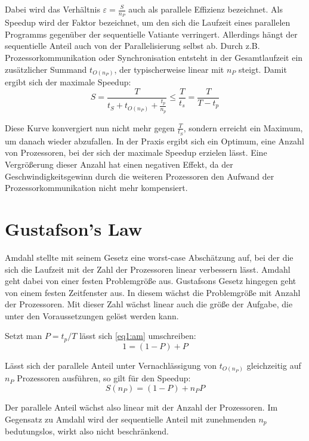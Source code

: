		Dabei wird das Verhältnis $\varepsilon = \frac{S}{n_P}$ auch als \gls{parallele Effizienz} bezeichnet. Als \Gls{Speedup} wird der Faktor bezeichnet, um den sich die Laufzeit eines parallelen Programms gegenüber der sequentielle Vatiante verringert.
		Allerdings hängt der sequentielle Anteil auch von der Parallelisierung selbst ab. Durch z.B. Prozessorkommunikation oder Synchronisation entsteht in der Gesamtlaufzeit ein zusätzlicher Summand	$t_{O(n_P)}$, der typischerweise linear mit $n_P$ steigt. Damit ergibt sich der maximale \Gls{Speedup}:		
		\begin{equation}
		    S = \frac{T}{t_S + t_{O(n_P)} + \frac{t_p}{n_p}} \leq \frac{T}{t_s} = \frac{T}{T-t_p}		
		\end{equation}
		
		Diese Kurve konvergiert nun nicht mehr gegen $\frac{T}{t_S}$, sondern erreicht ein Maximum, um danach wieder abzufallen. In der Praxis ergibt sich ein Optimum, eine Anzahl von Prozessoren, bei der sich der maximale \Gls{Speedup} erzielen lässt. Eine Vergrößerung dieser Anzahl hat einen negativen Effekt, da der Geschwindigkeitsgewinn durch die weiteren Prozessoren den Aufwand der Prozessorkommunikation nicht mehr kompensiert.


		\section{Gustafson's Law}
		Amdahl stellte mit seinem Gesetz eine worst-case Abschätzung auf, bei der die sich die Laufzeit mit der Zahl der Prozessoren linear verbessern lässt. Amdahl geht dabei von einer festen Problemgröße aus. Gustafsons Gesetz hingegen geht von einem festen Zeitfenster aus. In diesem wächst die Problemgröße mit Anzahl der Prozessoren. Mit dieser Zahl wächst linear auch die größe der Aufgabe, die unter den Voraussetzungen gelöst werden kann.

		Setzt man $P=t_p/T$ lässt sich \ref{eq1:am} umschreiben:
		\begin{equation}
			1 = (1 - P) + P
		\end{equation}

    	Lässt sich der parallele Anteil unter Vernachlässigung von $t_{O(n_P)}$ gleichzeitig auf $n_P$ Prozessoren ausführen, so gilt für den \Gls{Speedup}:
    	\begin{equation}
        	S(n_P) = (1 - P) + n_P P
    	\end{equation}
		
		Der parallele Anteil wächst also linear mit der Anzahl der Prozessoren. Im Gegensatz zu Amdahl wird der sequentielle Anteil mit zunehmenden $n_p$ bedutungslos, wirkt also nicht beschränkend.
		 
